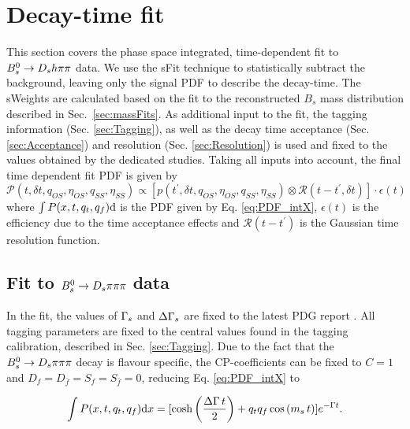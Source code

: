 \section{Decay-time fit}
\label{sec:timeFit}

This section covers the phase space integrated, time-dependent fit to ${{B}^0_{s}}\rightarrow{\ensuremath{{D}_{s}}}{\ensuremath{h}}{\ensuremath{\pi}}{\ensuremath{\pi}}$ data.
We use the \textsf{sFit} technique \cite{Pivk:2004ty} to statistically subtract the background, leaving only the signal PDF to describe the decay-time. 
The \textsf{sWeights} are calculated based on the fit to the reconstructed $B_s$ mass distribution described in Sec.~\ref{sec:massFits}.
As additional input to the fit, the tagging information (Sec. \ref{sec:Tagging}), 
as well as the decay time acceptance (Sec. \ref{sec:Acceptance}) and resolution (Sec. \ref{sec:Resolution}) is used and fixed to the values obtained by the dedicated studies. 
Taking all inputs into account, the final time dependent fit PDF is given by
\begin{equation}
\label{eq:TPDF_full}
\mathcal{P}(t,\delta t, q_{OS}, \eta_{OS}, q_{SS}, \eta_{SS}) \propto \left[ p(t^{'},\delta t, q_{OS}, \eta_{OS}, q_{SS}, \eta_{SS})  \otimes \mathcal{R}(t - t^{'},\delta t) \right] \cdot \epsilon(t)
\end{equation}
where $\int P(x,t,q_t,q_f) \text d$ is the PDF given by Eq. \ref{eq:PDF_intX}, $\epsilon(t)$ is the efficiency due to the time acceptance effects and $\mathcal{R}(t - t^{'})$ is the Gaussian time resolution function. 



\subsection{Fit to ${{B}^0_{s}}\rightarrow{\ensuremath{{D}_{s}}}{\ensuremath{\pi}}{\ensuremath{\pi}}{\ensuremath{\pi}}$ data}  

In the fit, the values of ${\Gamma_{{s}}}$ and ${\Delta\Gamma_{{s}}}$ are fixed to the latest PDG report \cite{PDG2016}. All tagging parameters are fixed to the central values found in the tagging calibration, described in Sec. \ref{sec:Tagging}.
Due to the fact that the ${{B}^0_{s}}\rightarrow{\ensuremath{{D}_{s}}}{\ensuremath{\pi}}{\ensuremath{\pi}}{\ensuremath{\pi}}$ decay is flavour specific, the CP-coefficients can be fixed to $C=1$ and $D_{f} = D_{\bar{f}} = S_{f} = S_{\bar{f}} = 0$, reducing Eq. \ref{eq:PDF_intX} to

\begin{equation}
\int P(x,t,q_t,q_f) \text d x = [\text{cosh} \left( \frac{\Delta \Gamma \, t}{2}\right) + q_t q_f \, \text{cos} \left( m_s \, t \right)] e^{- \Gamma t}.
\end{equation}

